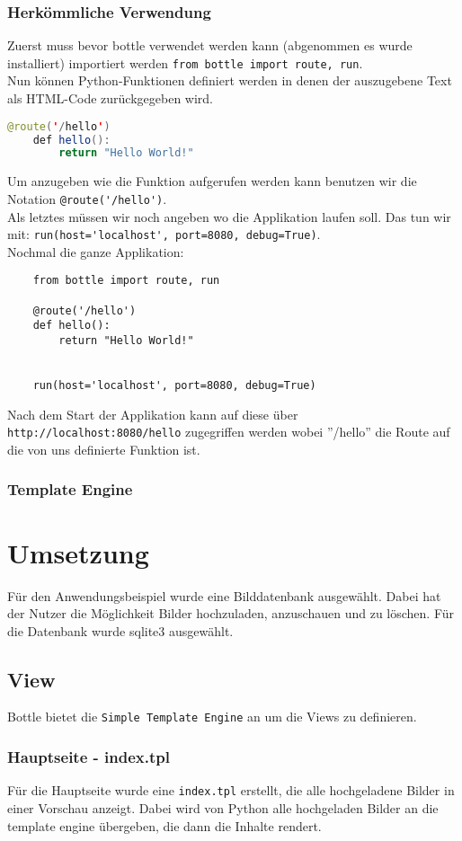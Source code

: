 \subsubsection{Herkömmliche Verwendung}
Zuerst muss bevor bottle verwendet werden kann (abgenommen es wurde installiert) importiert werden \verb|from bottle import route, run|. \\
Nun können Python-Funktionen definiert werden in denen der auszugebene Text als HTML-Code zurückgegeben wird. 
\begin{lstlisting}[language=Java]
	@route('/hello')
	def hello():
		return "Hello World!"
\end{lstlisting}
Um anzugeben wie die Funktion aufgerufen werden kann benutzen wir die Notation \verb|@route('/hello')|.\\
Als letztes müssen wir noch angeben wo die Applikation laufen soll. Das tun wir mit: \verb|run(host='localhost', port=8080, debug=True)|.\\
Nochmal die ganze Applikation:
\begin{lstlisting}
	from bottle import route, run
	
	@route('/hello')
	def hello():
		return "Hello World!"
		
		
	run(host='localhost', port=8080, debug=True)
\end{lstlisting}

Nach dem Start der Applikation kann auf diese über \verb| http://localhost:8080/hello| zugegriffen werden wobei ''/hello'' die Route auf die von uns definierte Funktion ist.

\subsubsection{Template Engine}
\section{Umsetzung}
Für den Anwendungsbeispiel wurde eine Bilddatenbank ausgewählt. Dabei hat der Nutzer die Möglichkeit Bilder hochzuladen, anzuschauen und zu löschen. Für die Datenbank wurde sqlite3 ausgewählt.

\subsection{View}
Bottle bietet die \verb|Simple Template Engine| an um die Views zu definieren. 

\subsubsection{Hauptseite - index.tpl}
Für die Hauptseite wurde eine \verb|index.tpl| erstellt, die alle hochgeladene Bilder in einer Vorschau anzeigt. Dabei wird von Python alle hochgeladen Bilder an die template engine übergeben, die dann die Inhalte rendert.

